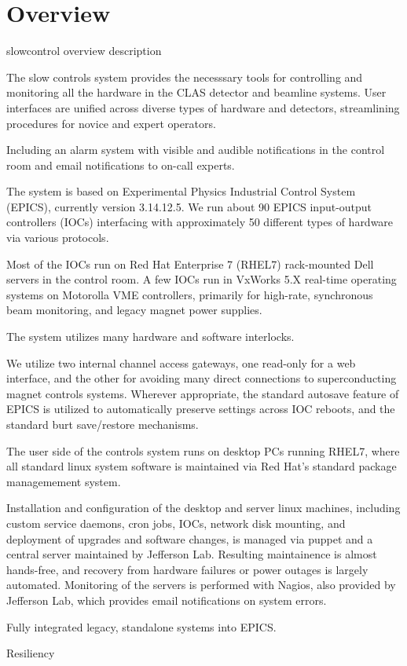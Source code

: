 \section{Overview}

slowcontrol overview description \cite{einstein}

The slow controls system provides the necesssary tools for controlling and monitoring all the hardware in the CLAS detector and beamline systems.  User interfaces are unified across diverse types of hardware and detectors, streamlining procedures for novice and expert operators.

Including an alarm system with visible and audible notifications in the control room and email notifications to on-call experts.

The system is based on Experimental Physics Industrial Control System (EPICS), currently version 3.14.12.5.  We run about 90 EPICS input-output controllers (IOCs) interfacing with approximately 50 different types of hardware via various protocols.

Most of the IOCs run on Red Hat Enterprise 7 (RHEL7) rack-mounted Dell servers in the control room.  A few IOCs run in VxWorks 5.X real-time operating systems on Motorolla VME controllers, primarily for high-rate, synchronous beam monitoring, and legacy magnet power supplies.

The system utilizes many hardware and software interlocks.

We utilize two internal channel access gateways, one read-only for a web interface, and the other for avoiding many direct connections to superconducting magnet controls systems.  Wherever appropriate, the standard autosave feature of EPICS is utilized to automatically preserve settings across IOC reboots, and the standard burt save/restore mechanisms.

The user side of the controls system runs on desktop PCs running RHEL7, where all standard linux system software is maintained via Red Hat's standard package managemement system.

Installation and configuration of the desktop and server linux machines, including custom service daemons, cron jobs, IOCs, network disk mounting, and deployment of upgrades and software changes, is managed via puppet and a central server maintained by Jefferson Lab.  Resulting maintainence is almost hands-free, and recovery from hardware failures or power outages is largely automated.  Monitoring of the servers is performed with Nagios, also provided by Jefferson Lab, which provides email notifications on system errors.

Fully integrated legacy, standalone systems into EPICS.

Resiliency

